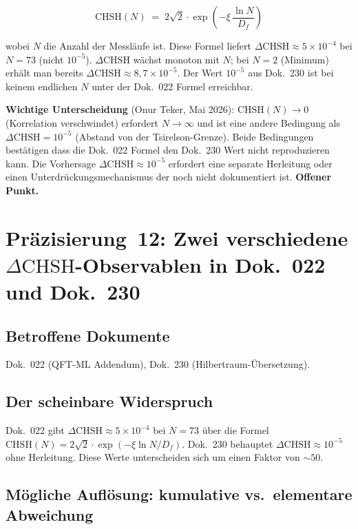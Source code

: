 \begin{equation}
  \text{CHSH}(N) \;=\; 2\sqrt{2}\cdot\exp\!\left(-\xi\,\frac{\ln N}{D_f}\right)
  \tag{190.20}
\end{equation}

wobei $N$ die Anzahl der Messläufe ist. Diese Formel liefert
$\Delta\text{CHSH} \approx 5\times10^{-4}$ bei $N=73$ (nicht $10^{-5}$).
$\Delta\text{CHSH}$ wächst monoton mit $N$; bei $N=2$ (Minimum) erhält
man bereits $\Delta\text{CHSH} \approx 8{,}7\times10^{-5}$.
Der Wert $10^{-5}$ aus Dok.~230 ist bei keinem endlichen $N$ unter der
Dok.~022 Formel erreichbar.

\textbf{Wichtige Unterscheidung} (Onur Teker, Mai 2026):
$\text{CHSH}(N)\to 0$ (Korrelation verschwindet) erfordert $N\to\infty$
und ist eine andere Bedingung als $\Delta\text{CHSH}=10^{-5}$
(Abstand von der Tsirelson-Grenze). Beide Bedingungen bestätigen dass
die Dok.~022 Formel den Dok.~230 Wert nicht reproduzieren kann.
Die Vorhersage $\Delta\text{CHSH}\approx 10^{-5}$ erfordert eine
separate Herleitung oder einen Unterdrückungsmechanismus der noch nicht
dokumentiert ist. \textbf{Offener Punkt.}


\section{\texorpdfstring{Präzisierung~12: Zwei verschiedene $\Delta\text{CHSH}$-Observablen in Dok.~022 und Dok.~230}{Präzisierung 12: Zwei verschiedene CHSH-Observablen}}

\subsection*{Betroffene Dokumente}

Dok.~022 (QFT-ML Addendum), Dok.~230 (Hilbertraum-Übersetzung).

\subsection*{Der scheinbare Widerspruch}

Dok.~022 gibt $\Delta\text{CHSH} \approx 5\times10^{-4}$ bei $N=73$
über die Formel $\text{CHSH}(N) = 2\sqrt{2}\cdot\exp(-\xi\ln N/D_f)$.
Dok.~230 behauptet $\Delta\text{CHSH} \approx 10^{-5}$ ohne Herleitung.
Diese Werte unterscheiden sich um einen Faktor von $\sim50$.

\subsection*{Mögliche Auflösung: kumulative vs.\ elementare Abweichung}

